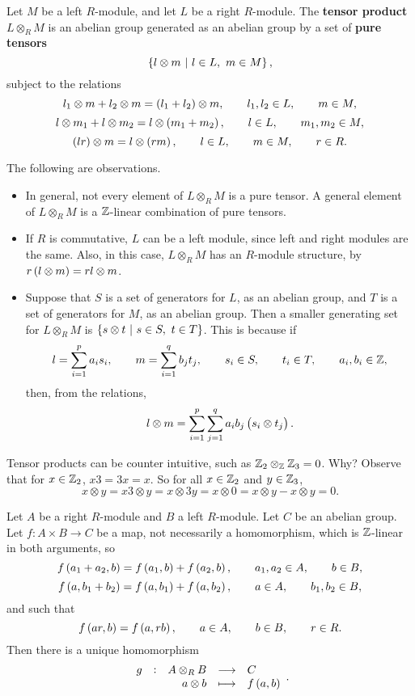 \begin{definition}
Let $ M $ be a left $ R $-module, and let $ L $ be a right $ R $-module. The \textbf{tensor product} $ L \otimes_R M $ is an abelian group generated as an abelian group by a set of \textbf{pure tensors}
$$ \cbr{l \otimes m \st l \in L, \ m \in M}, $$
subject to the relations
$$ l_1 \otimes m + l_2 \otimes m = \br{l_1 + l_2} \otimes m, \qquad l_1, l_2 \in L, \qquad m \in M, $$
$$ l \otimes m_1 + l \otimes m_2 = l \otimes \br{m_1 + m_2}, \qquad l \in L, \qquad m_1, m_2 \in M, $$
$$ \br{lr} \otimes m = l \otimes \br{rm}, \qquad l \in L, \qquad m \in M, \qquad r \in R. $$
\end{definition}

The following are observations.
\begin{itemize}
\item In general, not every element of $ L \otimes_R M $ is a pure tensor. A general element of $ L \otimes_R M $ is a $ \mathbb{Z} $-linear combination of pure tensors.
\item If $ R $ is commutative, $ L $ can be a left module, since left and right modules are the same. Also, in this case, $ L \otimes_R M $ has an $ R $-module structure, by $ r\br{l \otimes m} = rl \otimes m $.
\item Suppose that $ S $ is a set of generators for $ L $, as an abelian group, and $ T $ is a set of generators for $ M $, as an abelian group. Then a smaller generating set for $ L \otimes_R M $ is $ \cbr{s \otimes t \st s \in S, \ t \in T} $. This is because if
$$ l = \sum_{i = 1}^p a_is_i, \qquad m = \sum_{i = 1}^q b_jt_j, \qquad s_i \in S, \qquad t_i \in T, \qquad a_i, b_i \in \mathbb{Z}, $$
then, from the relations,
$$ l \otimes m = \sum_{i = 1}^p \sum_{j = 1}^q a_ib_j\br{s_i \otimes t_j}. $$
\end{itemize}

\begin{example*}
Tensor products can be counter intuitive, such as $ \mathbb{Z}_2 \otimes_{\mathbb{Z}} \mathbb{Z}_3 = 0 $. Why? Observe that for $ x \in \mathbb{Z}_2 $, $ x3 = 3x = x $. So for all $ x \in \mathbb{Z}_2 $ and $ y \in \mathbb{Z}_3 $,
$$ x \otimes y = x3 \otimes y = x \otimes 3y = x \otimes 0 = x \otimes y - x \otimes y = 0. $$
\end{example*}


\begin{theorem}
Let $ A $ be a right $ R $-module and $ B $ a left $ R $-module. Let $ C $ be an abelian group. Let $ f : A \times B \to C $ be a map, not necessarily a homomorphism, which is $ \mathbb{Z} $-linear in both arguments, so
$$ f\br{a_1 + a_2, b} = f\br{a_1, b} + f\br{a_2, b}, \qquad a_1, a_2 \in A, \qquad b \in B, $$
$$ f\br{a, b_1 + b_2} = f\br{a, b_1} + f\br{a, b_2}, \qquad a \in A, \qquad b_1, b_2 \in B, $$
and such that
$$ f\br{ar, b} = f\br{a, rb}, \qquad a \in A, \qquad b \in B, \qquad r \in R. $$
Then there is a unique homomorphism
$$ \function[g]{A \otimes_R B}{C}{a \otimes b}{f\br{a, b}}. $$
\end{theorem}

